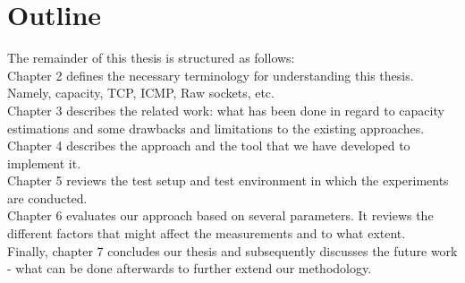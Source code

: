 \section{Outline}
The remainder of this thesis is structured as follows:
\\Chapter 2 defines the necessary terminology for understanding this thesis. Namely, capacity, TCP, ICMP, Raw sockets, etc. 
\\Chapter 3 describes the related work: what has been done in regard to capacity estimations and some drawbacks and limitations to the existing approaches.
\\Chapter 4 describes the approach and the tool that we have developed to implement it. 
\\Chapter 5 reviews the test setup and test environment in which the experiments are conducted.
\\Chapter 6 evaluates our approach based on several parameters. It reviews the different factors that might affect the measurements and to what extent.
\\Finally, chapter 7 concludes our thesis and subsequently discusses the future work - what can be done afterwards to further extend our methodology. 